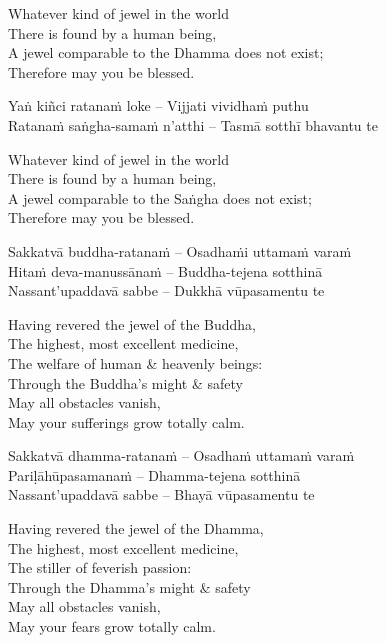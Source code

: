 \begin{english}
  Whatever kind of jewel in the world\\
  There is found by a human being,\\
  A jewel comparable to the Dhamma does not exist;\\
  Therefore may you be blessed.
\end{english}

Yaṅ kiñci ratanaṁ loke – Vijjati vividhaṁ puthu\\
Ratanaṁ saṅgha-samaṁ n’atthi – Tasmā sotthī bhavantu te

\begin{english}
  Whatever kind of jewel in the world\\
  There is found by a human being,\\
  A jewel comparable to the Saṅgha does not exist;\\
  Therefore may you be blessed.
\end{english}

Sakkatvā buddha-ratanaṁ – Osadhaṁi uttamaṁ varaṁ\\
Hitaṁ deva-manussānaṁ – Buddha-tejena sotthinā\\
Nassant’upaddavā sabbe – Dukkhā vūpasamentu te

\begin{english}
  Having revered the jewel of the Buddha,\\
  The highest, most excellent medicine,\\
  The welfare of human \& heavenly beings:\\
  Through the Buddha’s might \& safety\\
  May all obstacles vanish,\\
  May your sufferings grow totally calm.
\end{english}

Sakkatvā dhamma-ratanaṁ – Osadhaṁ uttamaṁ varaṁ\\
Pariḷāhūpasamanaṁ – Dhamma-tejena sotthinā\\
Nassant’upaddavā sabbe – Bhayā vūpasamentu te

\begin{english}
  Having revered the jewel of the Dhamma,\\
  The highest, most excellent medicine,\\
  The stiller of feverish passion:\\
  Through the Dhamma’s might \& safety\\
  May all obstacles vanish,\\
  May your fears grow totally calm.
\end{english}

